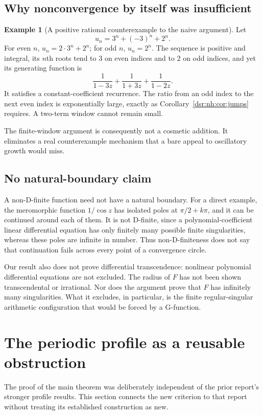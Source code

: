 \documentclass[11pt,a4paper]{article}
\numberwithin{equation}{section}
\theoremstyle{definition}
\theoremstyle{remark}
\theoremstyle{definition}
\newtheorem{example}[theorem]{Example}
\theoremstyle{plain}
\begin{document}
\subsection{Why nonconvergence by itself was insufficient}
\begin{example}[A positive rational counterexample to the naive argument]
\label{dsr:nh:ex:parity}
Let
\[
u_n=3^n+(-3)^n+2^n.
\]
For even $n$, $u_n=2\cdot3^n+2^n$; for odd $n$, $u_n=2^n$.
The sequence is positive and integral, its $n$th roots tend to $3$ on even
indices and to $2$ on odd indices, and yet its generating function is
\[
\frac1{1-3z}+\frac1{1+3z}+\frac1{1-2z}.
\]
It satisfies a constant-coefficient recurrence. The ratio from an odd index
to the next even index is exponentially large, exactly as
Corollary~\ref{dsr:nh:cor:jumps} requires. A two-term window cannot remain small.
\end{example}
The finite-window argument is consequently not a cosmetic addition. It
eliminates a real counterexample mechanism that a bare appeal to
oscillatory growth would miss.

\subsection{No natural-boundary claim}
A non-D-finite function need not have a natural boundary. For a direct
example, the meromorphic function $1/\cos z$ has isolated poles at
$\pi/2+k\pi$, and it can be continued around each of them. It is not
D-finite, since a polynomial-coefficient linear differential equation has
only finitely many possible finite singularities, whereas these poles are
infinite in number. Thus non-D-finiteness does not say that continuation
fails across every point of a convergence circle.

Our result also does not prove differential transcendence: nonlinear
polynomial differential equations are not excluded. The radius of $F$
has not been shown transcendental or irrational. Nor does the argument
prove that $F$ has infinitely many singularities. What it excludes, in
particular, is the finite regular-singular arithmetic configuration that
would be forced by a G-function.

\section{The periodic profile as a reusable obstruction}
\label{dsr:nh:sec:profile}
The proof of the main theorem was deliberately independent of the prior
report's stronger profile results. This section connects the new criterion
to that report without treating its established construction as new.
\end{document}
